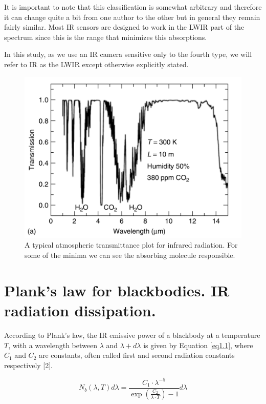 		It is important to note that this classification is somewhat arbitrary and therefore it can change quite a bit from one author to the other but in general they remain fairly similar. Most IR sensors are designed to work in the LWIR part of the spectrum since this is the range that minimizes this absorptions.
		
		In this study, as we use an IR camera sensitive only to the fourth type, we will refer to IR as the LWIR except otherwise explicitly stated.
		
		\begin{figure}[ht!]
			\centering
			\captionsetup{justification=centering,margin=2cm}
			\includegraphics[scale=0.45]{Figures/Chapter01/Transmission.pdf}
			\caption{A typical atmospheric transmittance plot  for infrared radiation. For some of the minima we can see the absorbing molecule responsible.}\label{fig1.2}
		\end{figure}
		
	\section{Plank's law for blackbodies. IR radiation dissipation.}\label{section1.2}
	
		According to Plank's law, the IR emissive power of a blackbody at a temperature $T$, with a wavelength between $\lambda$ and $\lambda+d\lambda$ is given by Equation \ref{eq1.1}, where $C_{1}$ and $C_{2}$ are constants, often called first and second radiation constants respectively [2].
		
		\begin{equation}\label{eq1.1}
			N_{b}(\lambda,T)d\lambda=\frac{C_{1} \cdot \lambda^{-5}}{\exp (\frac{C_{2}}{\lambda\cdot T}) -1} d\lambda
		\end{equation}
		
